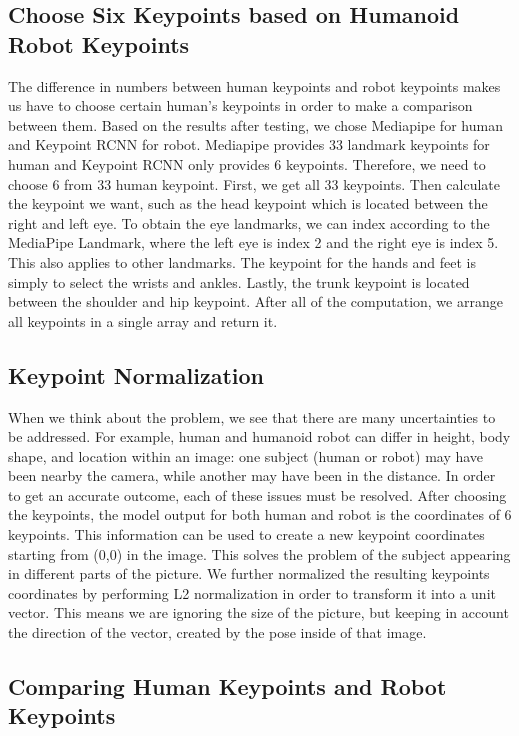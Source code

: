 \subsection{Choose Six Keypoints based on Humanoid Robot Keypoints}
\label{subsec:choose-keypoints}

The difference in numbers between human keypoints and robot keypoints makes us have to choose certain human's keypoints in order to make a comparison between them.
Based on the results after testing, we chose Mediapipe for human and Keypoint RCNN for robot. Mediapipe provides 33 landmark keypoints for human and Keypoint RCNN only provides 6 keypoints.
Therefore, we need to choose 6 from 33 human keypoint.
First, we get all 33 keypoints. Then calculate the keypoint we want, such as the head keypoint which is located between the right and left eye.
To obtain the eye landmarks, we can index according to the MediaPipe Landmark, where the left eye is index 2 and the right eye is index 5. This also applies to other landmarks.
The keypoint for the hands and feet is simply to select the wrists and ankles.
Lastly, the trunk keypoint is located between the shoulder and hip keypoint.
After all of the computation, we arrange all keypoints in a single array and return it.


\subsection{Keypoint Normalization}
\label{subsec:keypoint-normalization}

When we think about the problem, we see that there are many uncertainties to be addressed. For example, human and humanoid robot can differ in height, body shape, and location within an image: one subject (human or robot) may have been nearby the camera,
while another may have been in the distance. In order to get an accurate outcome, each of these issues must be resolved.
After choosing the keypoints, the model output for both human and robot is the coordinates of 6 keypoints. This information can be used to create a new keypoint coordinates starting from (0,0) in the image. This solves the problem of the subject appearing in different parts of the picture.
We further normalized the resulting keypoints coordinates by performing L2 normalization in order to transform it into a unit vector.
This means we are ignoring the size of the picture, but keeping in account the direction of the vector, created by the pose inside of that image.


\subsection{Comparing Human Keypoints and Robot Keypoints}
\label{subsec:comparing-keypoints}

